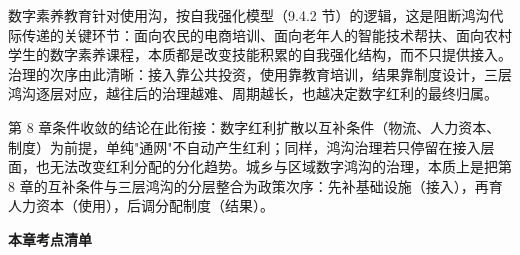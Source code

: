 数字素养教育针对使用沟，按自我强化模型（9.4.2 节）的逻辑，这是阻断鸿沟代际传递的关键环节：面向农民的电商培训、面向老年人的智能技术帮扶、面向农村学生的数字素养课程，本质都是改变技能积累的自我强化结构，而不只提供接入。治理的次序由此清晰：接入靠公共投资，使用靠教育培训，结果靠制度设计，三层鸿沟逐层对应，越往后的治理越难、周期越长，也越决定数字红利的最终归属。

第 8 章条件收敛的结论在此衔接：数字红利扩散以互补条件（物流、人力资本、制度）为前提，单纯"通网"不自动产生红利；同样，鸿沟治理若只停留在接入层面，也无法改变红利分配的分化趋势。城乡与区域数字鸿沟的治理，本质上是把第 8 章的互补条件与三层鸿沟的分层整合为政策次序：先补基础设施（接入），再育人力资本（使用），后调分配制度（结果）。

\begin{chapterbox}
\textbf{本章考点清单}


\end{chapterbox}
